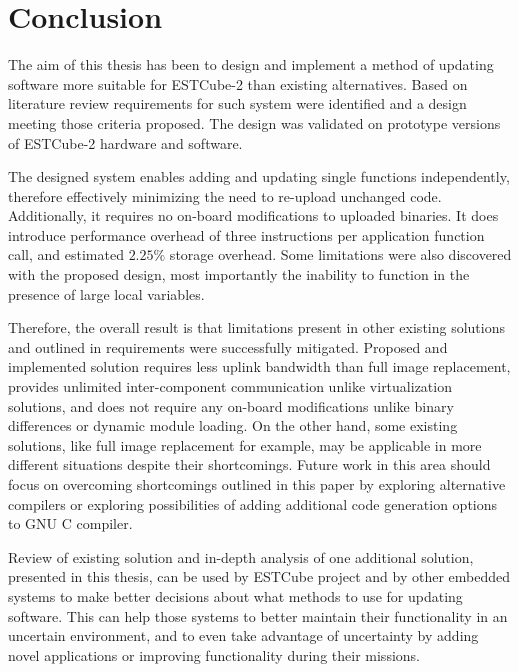\clearpage
\section{Conclusion}
\label{s:conclusion}

The aim of this thesis has been to design and implement a method of updating software more suitable for ESTCube-2 than existing alternatives. Based on literature review requirements for such system were identified and a design meeting those criteria proposed. The design was validated on prototype versions of ESTCube-2 hardware and software.

The designed system enables adding and updating single functions independently, therefore effectively minimizing the need to re-upload unchanged code. Additionally, it requires no on-board modifications to uploaded binaries. It does introduce performance overhead of three instructions per application function call, and estimated $2.25\%$ storage overhead. Some limitations were also discovered with the proposed design, most importantly the inability to function in the presence of large local variables.

Therefore, the overall result is that limitations present in other existing solutions and outlined in requirements were successfully mitigated. Proposed and implemented solution requires less uplink bandwidth than full image replacement, provides unlimited inter-component communication unlike virtualization solutions, and does not require any on-board modifications unlike binary differences or dynamic module loading. On the other hand, some existing solutions, like full image replacement for example, may be applicable in more different situations despite their shortcomings. Future work in this area should focus on overcoming shortcomings outlined in this paper by exploring alternative compilers or exploring possibilities of adding additional code generation options to GNU C compiler.

Review of existing solution and in-depth analysis of one additional solution, presented in this thesis, can be used by ESTCube project and by other embedded systems to make better decisions about what methods to use for updating software. This can help those systems to better maintain their functionality in an uncertain environment, and to even take advantage of uncertainty by adding novel applications or improving functionality during their missions.
